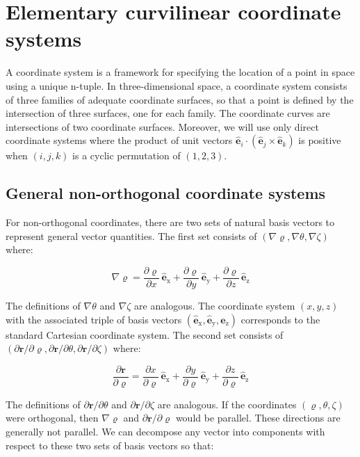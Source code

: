 \section{Elementary curvilinear coordinate systems}

A coordinate system is a framework for specifying the location of a point in space using a unique n-tuple. In three-dimensional space, a coordinate system consists of three families of adequate coordinate surfaces, so that a point is defined by the intersection of three surfaces, one for each family. The coordinate curves are intersections of two coordinate surfaces. Moreover, we will use only direct coordinate systems where the product of unit vectors $\mathbf{\hat{e}}_i\cdot(\mathbf{\hat{e}}_j\times\mathbf{\hat{e}}_k)$ is positive when $(i, j, k)$ is a cyclic permutation of $(1,2,3)$.

\subsection{General non-orthogonal coordinate systems}

For non-orthogonal coordinates, there are two sets of natural basis vectors to represent general vector quantities. The first set consists of $(\nabla\varrho,\nabla\theta,\nabla\zeta)$ where:

\begin{equation}
    \nabla\varrho=\frac{\partial\varrho}{\partial x}\,\mathbf{\hat{e}}_\text{x}+\frac{\partial\varrho}{\partial y}\,\mathbf{\hat{e}}_\text{y}+\frac{\partial\varrho}{\partial z}\,\mathbf{\hat{e}}_\text{z}
\end{equation}

The definitions of $\nabla\theta$ and $\nabla\zeta$ are analogous. The coordinate system $(x, y, z)$ with the associated triple of basis vectors $(\mathbf{\hat{e}}_\text{x}, \mathbf{\hat{e}}_\text{y}, \mathbf{\hat{e}}_\text{z})$ corresponds to the standard Cartesian coordinate system. The second set consists of $(\partial\mathbf{r}/\partial\varrho, \partial\mathbf{r}/\partial\theta, \partial\mathbf{r}/\partial\zeta)$ where:

\begin{equation}
    \frac{\partial\mathbf{r}}{\partial \varrho}=\frac{\partial x}{\partial\varrho}\,\mathbf{\hat{e}}_\text{x}+\frac{\partial y}{\partial\varrho}\,\mathbf{\hat{e}}_\text{y}+\frac{\partial z}{\partial\varrho}\,\mathbf{\hat{e}}_\text{z}
\end{equation}

The definitions of $\partial\mathbf{r}/\partial\theta$ and $\partial\mathbf{r}/\partial\zeta$ are analogous. If the coordinates $(\varrho, \theta, \zeta)$ were orthogonal, then $\nabla\varrho$ and $\partial\mathbf{r}/\partial\varrho$ would be parallel. These directions are generally not parallel. We can decompose any vector into components with respect to these two sets of basis vectors so that:

